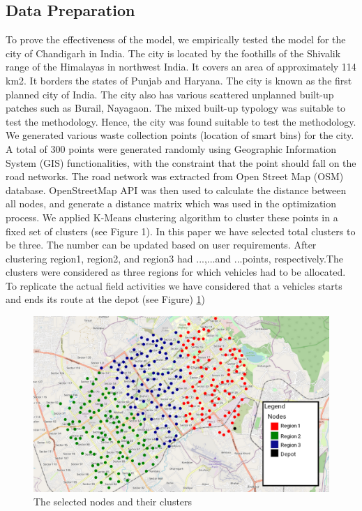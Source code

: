 \documentclass[12pt]{article}
\begin{document}
\subsection{Data Preparation}

To prove the effectiveness of the model, we empirically tested the model for the city of Chandigarh in India. The city is located by the foothills of the Shivalik range of the Himalayas in northwest India. It covers an area of approximately 114 km2. It borders the states of Punjab and Haryana. The city is known as the first planned city of India. The city also has various scattered unplanned built-up patches such as Burail, Nayagaon. The mixed built-up typology was suitable to test the methodology. Hence, the city was found suitable to test the methodology. We generated various waste collection points (location of smart bins) for the city. A total of 300 points were generated randomly using Geographic Information System (GIS) functionalities, with the constraint that the point should fall on the road networks. The road network was extracted from Open Street Map (OSM) database. OpenStreetMap API was then used to calculate the distance between all nodes, and generate a distance matrix which was used in the optimization process. We applied K-Means clustering algorithm to cluster these points in a fixed set of clusters (see Figure 1). In this paper we have selected total clusters to be three. The number can be updated based on user requirements. After clustering region1, region2, and region3 had ...,...and ...points, respectively.The clusters were considered as three regions for which vehicles had to be allocated. To replicate the actual field activities we have considered that a vehicles starts and ends its route at the depot (see Figure) \ref{figm})


\begin{figure}[H]
    \centering
    \includegraphics[scale=0.4]{Nodes.png}
    \caption{The selected nodes and their clusters}\label{figm}
\end{figure}
\end{document}

